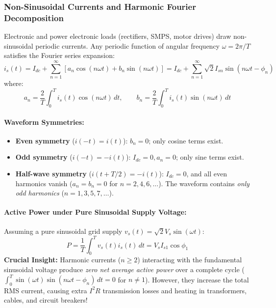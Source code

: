 \subsubsection{Non-Sinusoidal Currents and Harmonic Fourier Decomposition}
Electronic and power electronic loads (rectifiers, SMPS, motor drives) draw non-sinusoidal periodic currents. Any periodic function of angular frequency $\omega = 2\pi/T$ satisfies the Fourier series expansion:
\begin{equation}
i_s(t) = I_{dc} + \sum_{n=1}^\infty \left[ a_n \cos(n\omega t) + b_n \sin(n\omega t) \right] = I_{dc} + \sum_{n=1}^\infty \sqrt{2} I_{sn} \sin(n\omega t - \phi_n)
\end{equation}
where:
\begin{equation}
a_n = \frac{2}{T}\int_0^T i_s(t)\cos(n\omega t)\,dt, \qquad b_n = \frac{2}{T}\int_0^T i_s(t)\sin(n\omega t)\,dt
\end{equation}
\paragraph{Waveform Symmetries:}
\begin{itemize}
  \item \textbf{Even symmetry} ($i(-t) = i(t)$): $b_n = 0$; only cosine terms exist.
  \item \textbf{Odd symmetry} ($i(-t) = -i(t)$): $I_{dc} = 0, a_n = 0$; only sine terms exist.
  \item \textbf{Half-wave symmetry} ($i(t + T/2) = -i(t)$): $I_{dc} = 0$, and all even harmonics vanish ($a_n = b_n = 0$ for $n = 2, 4, 6, \dots$). The waveform contains \emph{only odd harmonics} ($n = 1, 3, 5, 7, \dots$).
\end{itemize}

\paragraph{Active Power under Pure Sinusoidal Supply Voltage:}
Assuming a pure sinusoidal grid supply $v_s(t) = \sqrt{2} V_s \sin(\omega t)$:
\begin{equation}
P = \frac{1}{T}\int_0^T v_s(t) i_s(t)\,dt = V_s I_{s1} \cos\phi_1
\end{equation}
\textbf{Crucial Insight:} Harmonic currents ($n \ge 2$) interacting with the fundamental sinusoidal voltage produce \emph{zero net average active power} over a complete cycle ($\int_0^T \sin(\omega t)\sin(n\omega t - \phi_n)\,dt = 0$ for $n \ne 1$). However, they increase the total RMS current, causing extra $I^2 R$ transmission losses and heating in transformers, cables, and circuit breakers!

